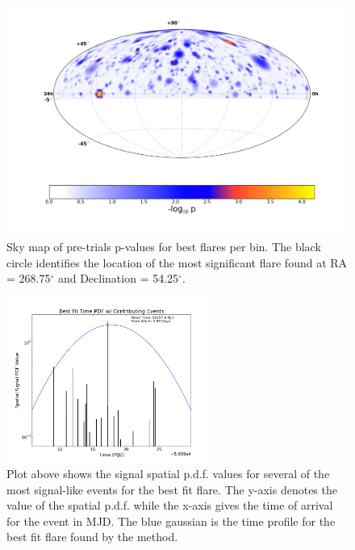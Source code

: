 \documentclass{gatech-thesis}
\begin{document}
\begin{figure}[ht]
  \begin{center}
    \includegraphics[width=1.0\textwidth,keepaspectratio]{RealResultSkyMap.png}
  \end{center}
  \caption{Sky map of pre-trials p-values for best flares per bin. The black circle identifies the location of the most significant flare found at RA = 268.75$^\circ$ and Declination = 54.25$^\circ$.}
  \label{fig:RealSkyMap}
\end{figure}

\begin{figure}[ht]
  \begin{center}
    \includegraphics[width=0.6\textwidth,keepaspectratio]{SpatialPDFValue_EventsArrivingNearFlareTime.png}
  \end{center}
  \caption{Plot above shows the signal spatial p.d.f. values for several of the most signal-like events for the best fit flare. The y-axis denotes the value of the spatial p.d.f. while the x-axis gives the time of arrival for the event in MJD. The blue gaussian is the time profile for the best fit flare found by the method.}
  \label{fig:TopEvents}
\end{figure}
\end{document}
